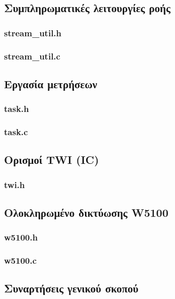 \subsection*{Συμπληρωματικές λειτουργίες ροής}
\subsubsection*{stream\_util.h}

\subsubsection*{stream\_util.c}



\subsection*{Εργασία μετρήσεων}
\subsubsection*{task.h}

\subsubsection*{task.c}



\subsection*{Ορισμοί TWI (I\protect{}C)}
\subsubsection*{twi.h}



\subsection*{Ολοκληρωμένο δικτύωσης W5100}
\subsubsection*{w5100.h}

\subsubsection*{w5100.c}



\subsection*{Συναρτήσεις γενικού σκοπού}
